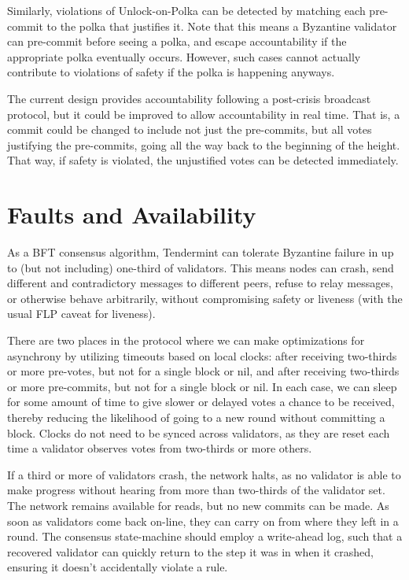 Similarly, violations of Unlock-on-Polka can be detected by matching each pre-commit
to the polka that justifies it. 
Note that this means a Byzantine validator can pre-commit before seeing a polka,
and escape accountability if the appropriate polka eventually occurs.
However, such cases cannot actually contribute to violations of safety 
if the polka is happening anyways.

The current design provides accountability following a post-crisis broadcast protocol,
but it could be improved to allow accountability in real time. 
That is, a commit could be changed to include not just the pre-commits, but all votes 
justifying the pre-commits, going all the way back to the beginning of the height.
That way, if safety is violated, the unjustified votes can be detected immediately.

\section{Faults and Availability}

As a BFT consensus algorithm, Tendermint can tolerate Byzantine failure in up to 
(but not including) one-third of validators.
This means nodes can crash, send different and contradictory messages to different peers, 
refuse to relay messages, or otherwise behave arbitrarily,
without compromising safety or liveness (with the usual FLP caveat for liveness).

There are two places in the protocol where we can make optimizations 
for asynchrony by utilizing timeouts based on local clocks:
after receiving two-thirds or more pre-votes, but not for a single block or nil, 
and after receiving two-thirds or more pre-commits, 
but not for a single block or nil.
In each case, we can sleep for some amount of time to give slower or delayed votes a chance to be received,
thereby reducing the likelihood of going to a new round without committing a block.
Clocks do not need to be synced across validators, 
as they are reset each time a validator observes votes from two-thirds or more others.

If a third or more of validators crash, the network halts, 
as no validator is able to make progress without hearing from more than two-thirds of the validator set.
The network remains available for reads, but no new commits can be made.
As soon as validators come back on-line, they can carry on from where they left in a round. 
The consensus state-machine should employ a write-ahead log,
such that a recovered validator can quickly return to the step it was in when it crashed,
ensuring it doesn't accidentally violate a rule.

